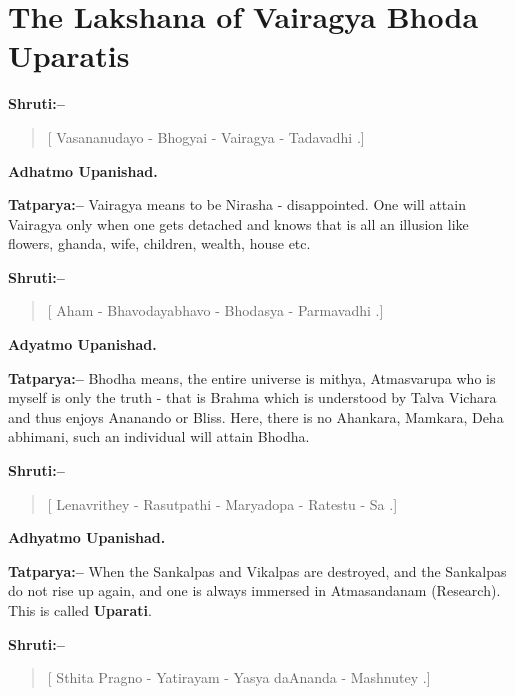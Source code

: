 \chapter{The Lakshana of Vairagya Bhoda Uparatis}

\textbf{Shruti:–}

\begin{verse}
[ Vasananudayo - Bhogyai - Vairagya - Tadavadhi .]
\end{verse}

\begin{flushright}
\textbf{Adhatmo Upanishad.}
\end{flushright}

\textbf{Tatparya:–} Vairagya means to be Nirasha - disappointed. One will attain Vairagya only when one gets detached and knows that is all an illusion like flowers, ghanda, wife, children, wealth, house etc.

\textbf{Shruti:–}

\begin{verse}
[ Aham - Bhavodayabhavo - Bhodasya - Parmavadhi .]
\end{verse}

\begin{flushright}
\textbf{Adyatmo Upanishad.}
\end{flushright}

\textbf{Tatparya:–} Bhodha means, the entire universe is mithya, Atmasvarupa who is myself is only the truth - that is Brahma which is understood by Talva Vichara and thus enjoys Ananando or Bliss. Here, there is no Ahankara, Mamkara, Deha abhimani, such an individual will attain Bhodha.

\newpage

\textbf{Shruti:–}

\begin{verse}
[ Lenavrithey - Rasutpathi - Maryadopa - Ratestu - Sa .]
\end{verse}

\begin{flushright}
\textbf{Adhyatmo Upanishad.}
\end{flushright}

\textbf{Tatparya:–} When the Sankalpas and Vikalpas are destroyed, and the Sankalpas do not rise up again, and one is always immersed in Atmasandanam (Research). This is called \textbf{Uparati}.

\textbf{Shruti:–}

\begin{verse}
[ Sthita Pragno - Yatirayam - Yasya daAnanda - Mashnutey .]
\end{verse}


